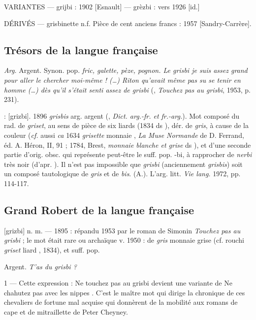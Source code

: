 VARIANTES ---  grijbi : 1902 [Esnault] --- grèzbi : vers 1926 [id.]

DÉRIVÉS --- grisbinette n.f. Pièce de cent anciens francs : 1957
[Sandry-Carrère].


\subsection*{Trésors de la langue française}

\emph{Arg.} Argent. Synon. pop. \emph{fric, galette, pèze, pognon. Le grisbi je suis assez grand pour aller le chercher moi-même ! (\ldots) Riton qu'avait même pas su se tenir en homme (\ldots) dès qu'il s'était senti assez de grisbi} (, \emph{Touchez pas au grisbi}, 1953, p. 231).

 : [grizbi].   1896 \emph{grisbis}
arg. \og argent \fg{} (, \emph{Dict. arg.-fr. et fr.-arg.}). Mot composé du rad. de \emph{griset}, au sens de \og pièce de six liards \fg{} (1834 ds ), dér. de \emph{gris}, à cause de la couleur (\emph{cf.} aussi \emph{ca} 1634 \emph{grisette} \og monnaie \fg{}, \emph{La Muse Normande} de D. Ferrand, éd. A. Héron, II, 91 ; 1784, Brest, \emph{monnaie blanche et grise} ds ), et d'une seconde partie d'orig. obsc. qui représente peut-être le suff. pop. -bi, à rapprocher de \emph{nerbi} \og très noir \fg{} (d'apr. ). Il n'est pas impossible que \emph{grisbi} (anciennement \emph{grisbis}) soit un composé tautologique de \emph{gris} et de \emph{bis}.
  (A.). L'arg. litt. \emph{Vie lang.} 1972, pp. 114-117.


\subsection*{Grand Robert de la langue française}

[grizbi] n. m. --- 1895 : répandu 1953 par le roman de Simonin \emph{Touchez pas au grisbi} ; le mot était rare ou archaïque v. 1950 : de \emph{gris} \og monnaie grise \fg{} (cf. rouchi \emph{griset} \og liard \fg{}, 1834), et suff. pop.

 Argent. \emph{T'as du grisbi ?}

1 --- Cette expression : \og Ne touchez pas au grisbi \fg{} devient une variante de \og Ne chahutez pas avec les nippes \fg{}. C'est le maître mot qui dirige la chronique de ces chevaliers de fortune mal acquise qui donnèrent de la mobilité aux romans de cape et de mitraillette de Peter Cheyney.


